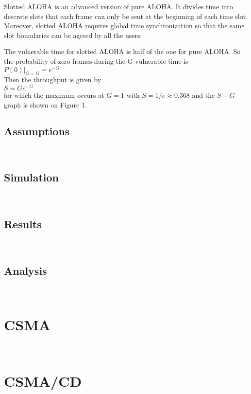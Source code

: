 \documentclass[11pt,oneside,a4paper]{report}
\begin{document}
Slotted ALOHA is an advanced version of pure ALOHA. It divides time into descrete slots that each frame can only be sent at the beginning of each time slot. Moreover, slotted ALOHA requires global time synchronization so that the same slot boundaries can be agreed by all the users.

The vulnerable time for slotted ALOHA is half of the one for pure ALOHA. So the probability of zero frames during the G vulnerable time is \\

\qquad \(P(0)|_{G=G} = e^{-G}\) \\

Then the throughput is given by \\

\qquad \(S = Ge^{-G}\) \\

for which the maximum occurs at \(G = 1\) with \(S = 1/e \approx 0.368\) and the \(S - G\) graph is shown on Figure 1.

\subsection*{Assumptions}

\\

\subsection*{Simulation}

\\

\subsection*{Results}

\\

\subsection*{Analysis}

\\

\section*{CSMA}

\\

\section*{CSMA/CD}

\\
\end{document}
